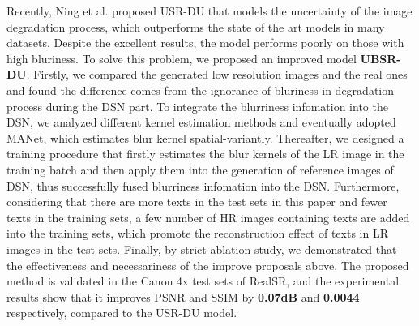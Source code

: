 Recently, Ning et al. proposed USR-DU that models the uncertainty of the image degradation process, which outperforms the state of the art models in many datasets. Despite the excellent results, the model performs poorly on those with high bluriness. To solve this problem, we proposed an improved model \textbf{UBSR-DU}. Firstly, we compared the generated low resolution images and the real ones and found the difference comes from the ignorance of bluriness in degradation process during the DSN part. To integrate the blurriness infomation into the DSN, we analyzed different kernel estimation methods and eventually adopted MANet, which estimates blur kernel spatial-variantly. Thereafter, we designed a training procedure that firstly estimates the blur kernels of the LR image in the training batch and then apply them into the generation of reference images of DSN, thus successfully fused blurriness infomation into the DSN. Furthermore, considering that there are more texts in the test sets in this paper and fewer texts in the training sets, a few number of HR images containing texts are added into the training sets, which promote the reconstruction effect of texts in LR images in the test sets. Finally, by strict ablation study, we demonstrated that the effectiveness and necessariness of the improve proposals above. The proposed method is validated in the Canon 4x test sets of RealSR, and the experimental results show that it improves PSNR and SSIM by \textbf{0.07dB} and \textbf{0.0044} respectively, compared to the USR-DU model.